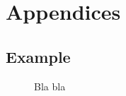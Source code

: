 \chapter{Appendices}

\begin{landscape}
    \section{Example}
    \label{app:example}
    \begin{figure}[h]
        \centering
        \caption{Bla bla}
    \end{figure}
\end{landscape}
\newpage